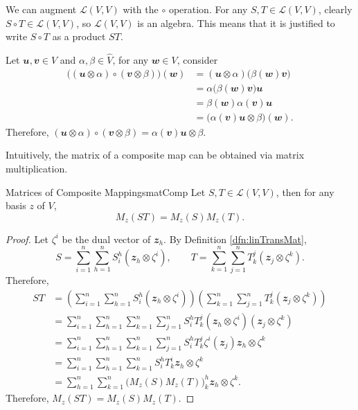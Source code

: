 \documentclass[math, code]{amznotes}
\theoremstyle{remark}
\begin{document}
We can augment $\mathcal{L}(V, V)$ with the $\circ$ operation. For any $S, T \in \mathcal{L}(V, V)$, clearly $S \circ T \in \mathcal{L}(V, V)$, so $\mathcal{L}(V, V)$ is an algebra. This means that it is justified to write $S \circ T$ as a product $ST$.

Let $\mathbfit{u}, \mathbfit{v} \in V$ and $\alpha, \beta \in \hat{V}$, for any $\mathbfit{w} \in V$, consider
\begin{align*}
    \bigl((\mathbfit{u} \otimes \alpha) \circ (\mathbfit{v} \otimes \beta)\bigr)(\mathbfit{w}) & = (\mathbfit{u} \otimes \alpha)\bigl(\beta(\mathbfit{w})\mathbfit{v}\bigr) \\
    & = \alpha\bigl(\beta(\mathbfit{w})\mathbfit{v}\bigr)\mathbfit{u} \\
    & = \beta(\mathbfit{w})\alpha(\mathbfit{v})\mathbfit{u} \\
    & = \bigl(\alpha(\mathbfit{v})\mathbfit{u} \otimes \beta\bigr)(\mathbfit{w}).
\end{align*}
Therefore, $(\mathbfit{u} \otimes \alpha) \circ (\mathbfit{v} \otimes \beta) = \alpha(\mathbfit{v})\mathbfit{u} \otimes \beta$.

Intuitively, the matrix of a composite map can be obtained via matrix multiplication.
\begin{probox}{Matrices of Composite Mappings}{matComp}
    Let $S, T \in \mathcal{L}(V, V)$, then for any basis $z$ of $V$, 
    \begin{equation*}
        M_z(ST) = M_z(S)M_z(T).
    \end{equation*}
    \tcblower
    \begin{proof}
        Let $\zeta^i$ be the dual vector of $\mathbfit{z}_h$. By Definition \ref{dfn:linTransMat}, 
        \begin{equation*}
            S = \sum_{i = 1}^{n}\sum_{h = 1}^{n}S^h_i(\mathbfit{z}_h \otimes \zeta^i), \qquad T = \sum_{k = 1}^{n}\sum_{j = 1}^{n}T^j_k(\mathbfit{z}_j \otimes \zeta^k).
        \end{equation*}
        Therefore,
        \begin{align*}
            ST & = \left(\sum_{i = 1}^{n}\sum_{h = 1}^{n}S^h_i(\mathbfit{z}_h \otimes \zeta^i)\right)\left(\sum_{k = 1}^{n}\sum_{j = 1}^{n}T^j_k(\mathbfit{z}_j \otimes \zeta^k)\right) \\
            & = \sum_{i = 1}^{n}\sum_{h = 1}^{n}\sum_{k = 1}^{n}\sum_{j = 1}^{n}S^h_iT^j_k(\mathbfit{z}_h \otimes \zeta^i)(\mathbfit{z}_j \otimes \zeta^k) \\
            & = \sum_{i = 1}^{n}\sum_{h = 1}^{n}\sum_{k = 1}^{n}\sum_{j = 1}^{n}S^h_iT^j_k\zeta^i(\mathbfit{z}_j)\mathbfit{z}_h \otimes \zeta^k \\
            & = \sum_{i = 1}^{n}\sum_{h = 1}^{n}\sum_{k = 1}^{n}S^h_iT^i_k\mathbfit{z}_h \otimes \zeta^k \\
            & = \sum_{h = 1}^{n}\sum_{k = 1}^{n}\bigl(M_z(S)M_z(T)\bigr)^h_k\mathbfit{z}_h \otimes \zeta^k.
        \end{align*}
        Therefore, $M_z(ST) = M_z(S)M_z(T)$.
    \end{proof}
\end{probox}
\end{document}
